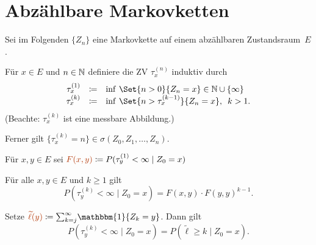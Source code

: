 \documentclass{cheat-sheet}
\newcommand{\ind}{\mathbbm{1}} %
\newcommand{\Defn}[1]{\textcolor{DefinitionColor}{#1}}
\begin{document}
\raggedcolumns %



\section{Abzählbare Markovketten}


\begin{nota}
  Sei im Folgenden $\{ Z_n \}$ eine Markovkette auf einem abzählbaren Zustandsraum~$E$.
\end{nota}

\begin{defn}
  Für $x \in E$ und $n \in \mathbb{N}$ definiere die ZV \Defn{$\tau_x^{(n)}$} induktiv durch
  \[ \begin{array}{r c l}
    \tau_x^{(1)} &\coloneqq& \inf\,\Set{n > 0}{Z_n = x} \in \N \cup \{ \infty \} \\
    \tau_x^{(k)} &\coloneqq& \inf\,\Set{n > \tau_x^{(k-1)}}{Z_n = x}, \enspace k > 1.
  \end{array} \]
  (Beachte: $\tau_x^{(k)}$ ist eine messbare Abbildung.)
\end{defn}

\begin{bem}
  Ferner gilt $\{ \tau_x^{(k)} = n \} \in \sigma(Z_0, Z_1, \ldots, Z_n)$.
\end{bem}

\begin{defn}
  Für $x, y \in E$ sei
  $\Defn{F(x, y)} \coloneqq P(\tau_y^{(1)} < \infty \mid Z_0 = x)$
\end{defn}

\begin{lem}
  Für alle $x, y \in E$ und $k \geq 1$ gilt
  \[ P(\tau_y^{(k)} < \infty \mid Z_0 = x) = F(x, y) \cdot F(y, y)^{k-1}. \]
\end{lem}

\begin{bem}
  Setze $\Defn{\widetilde{\ell}(y)} \coloneqq {\sum}_{k=j}^\infty \ind \{ Z_k = y \}$.
  Dann gilt
  \[ P(\tau_y^{(k)} < \infty \mid Z_0 = x) = P(\widetilde{\ell} \geq k \mid Z_0 = x). \]
\end{bem}
\end{document}
